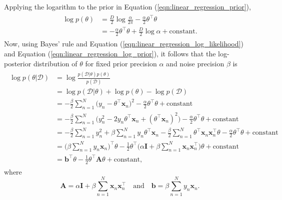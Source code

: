 \documentclass[msc,deptreport.inf]{infthesis} %
\newcommand{\matr}[1]{\mathbf{#1}}
\begin{document}
Applying the logarithm to the prior in Equation (\ref{eqn:linear_regression_prior}), 
\begin{align}\label{eqn:linear_regression_log_prior}
\begin{split}
	\log p(\theta) 
	& = \frac{D}{2} \log \frac{\alpha}{2\pi} - \frac{\alpha}{2} \theta^\intercal \theta \\
	& = -\frac{\alpha}{2} \theta^\intercal \theta + \frac{D}{2} \log \alpha + \text{constant}.
\end{split}
\end{align}
Now, using Bayes' rule and Equation (\ref{eqn:linear_regression_log_likelihood}) and Equation (\ref{eqn:linear_regression_log_prior}), it follows that the log-posterior distribution of $\theta$ for fixed prior precision $\alpha$ and noise precision $\beta$ is 
\begin{align}\label{eqn:linear_regression_log_posterior}
\begin{split}
	\log p(\theta | \mathcal{D}) 
	& = \log \frac{p(\mathcal{D} | \theta) p(\theta)}{p(\mathcal{D})} \\
	& = \log p(\mathcal{D} | \theta) + \log p(\theta) - \log p(\mathcal{D}) \\
	& = -\frac{\beta}{2} \sum_{n=1}^N \big(y_n - \theta^\intercal \matr{x}_n \big)^2 
	-\frac{\alpha}{2} \theta^\intercal \theta 
	+ \text{constant} \\
	& = -\frac{\beta}{2} \sum_{n=1}^N\big( y_n^2 - 2 y_n \theta^\intercal \matr{x}_n + (\theta^\intercal \matr{x}_n)^2 \big)
	-\frac{\alpha}{2} \theta^\intercal \theta
	+ \text{constant} \\
	& = -\frac{\beta}{2} \sum_{n=1}^N y_n^2
	+ \beta \sum_{n=1}^N y_n \theta^\intercal \matr{x}_n
	-\frac{\beta}{2} \sum_{n=1}^N \theta^\intercal \matr{x}_n \matr{x}_n^\intercal \theta
	-\frac{\alpha}{2} \theta^\intercal \theta
	+ \text{constant} \\
	& = \Big(\beta \sum_{n=1}^N y_n \matr{x}_n \Big)^\intercal \theta 
	-\frac{1}{2} \theta^\intercal \Big( \alpha \matr{I} + \beta \sum_{n=1}^N \matr{x}_n \matr{x}_n^\intercal \Big) \theta 
	+ \text{constant} \\
	& = \matr{b}^\intercal \theta 
	- \frac{1}{2} \theta^\intercal \matr{A} \theta 
	+ \text{constant},
\end{split}
\end{align}
where 
\begin{equation}
	\matr{A} = \alpha \matr{I} + \beta \sum_{n=1}^N \matr{x}_n \matr{x}_n^\intercal
	\quad \text{and} \quad 
	\matr{b} = \beta \sum_{n=1}^N y_n \matr{x}_n.
\end{equation}
\end{document}
